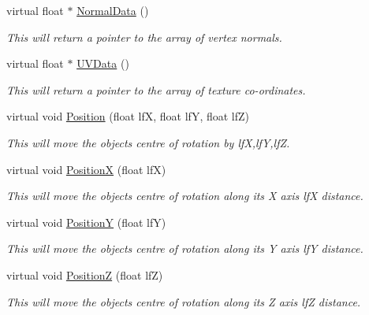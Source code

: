 \begin{DoxyCompactItemize}
virtual float $\ast$ \hyperlink{classv_mesh_tree_a661aab5444f7d4a888825d3cc3099359}{NormalData} ()
\begin{DoxyCompactList}\small\item\em This will return a pointer to the array of vertex normals. \item\end{DoxyCompactList}\item 
virtual float $\ast$ \hyperlink{classv_mesh_tree_a4baeb8fe7fa4adc70bca9f57e44340f0}{UVData} ()
\begin{DoxyCompactList}\small\item\em This will return a pointer to the array of texture co-\/ordinates. \item\end{DoxyCompactList}\item 
virtual void \hyperlink{classv_mesh_tree_adc47897475d306706531a28cfb65d7e7}{Position} (float lfX, float lfY, float lfZ)
\begin{DoxyCompactList}\small\item\em This will move the objects centre of rotation by lfX,lfY,lfZ. \item\end{DoxyCompactList}\item 
virtual void \hyperlink{classv_mesh_tree_a0f8d9ed827b6512ea4c39e85a972a433}{PositionX} (float lfX)
\begin{DoxyCompactList}\small\item\em This will move the objects centre of rotation along its X axis lfX distance. \item\end{DoxyCompactList}\item 
virtual void \hyperlink{classv_mesh_tree_ae245573465036da4cf45e9da0b113d86}{PositionY} (float lfY)
\begin{DoxyCompactList}\small\item\em This will move the objects centre of rotation along its Y axis lfY distance. \item\end{DoxyCompactList}\item 
virtual void \hyperlink{classv_mesh_tree_a7059fe190e656b0be3b9606da928198f}{PositionZ} (float lfZ)
\begin{DoxyCompactList}\small\item\em This will move the objects centre of rotation along its Z axis lfZ distance. \item\end{DoxyCompactList}\item 

\end{DoxyCompactItemize}
